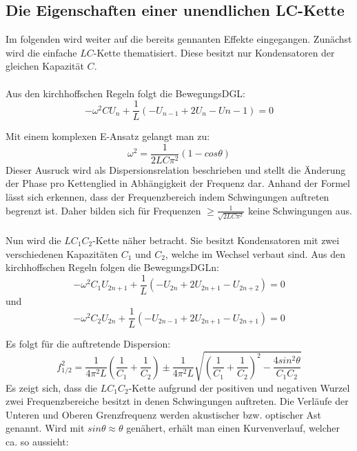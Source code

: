 \subsection{Die Eigenschaften einer unendlichen LC-Kette}


Im folgenden wird weiter auf die bereits gennanten Effekte eingegangen. Zunächst
 wird die einfache $LC$-Kette thematisiert. Diese besitzt nur Kondensatoren der
 gleichen Kapazität $C$.\\\\

Aus den kirchhoffschen Regeln folgt die BewegungsDGL:
\begin{equation}
- \omega ^2 C U_n + \frac{1}{L} \left( -U_{n-1} + 2U_ n -U{n-1} \right) = 0
\end{equation}

Mit einem komplexen E-Ansatz gelangt man zu:
\begin{equation}
\omega ^2 = \frac{1}{2LC\pi^2}(1-cos\theta)
\end{equation}
Dieser Ausruck wird als Dispersionsrelation beschrieben und stellt die Änderung
 der Phase pro Kettenglied in Abhängigkeit der Frequenz dar. Anhand der Formel lässt sich erkennen,
  dass der Frequenzbereich indem Schwingungen auftreten begrenzt ist. Daher bilden sich
   für Frequenzen $\geq \frac{1}{\sqrt{2LC\pi^2}}$ keine Schwingungen aus.\\\\

 Nun wird die $LC_1C_2$-Kette näher betracht. Sie besitzt Kondensatoren mit zwei
  verschiedenen Kapazitäten $C_1$ und $C_2$, welche im Wechsel verbaut sind.
 Aus den kirchhoffschen Regeln folgen die BewegungsDGLn:
 \begin{equation}
   -\omega^2 C_1 U_{2n+1} + \frac{1}{L} \left( -U_{2n} + 2U_{2n+1} - U_{2n+2} \right) = 0
 \end{equation}
 und
 \begin{equation}
   -\omega^2 C_2 U_{2n} + \frac{1}{L} \left( -U_{2n-1} + 2U_{2n+1} - U_{2n+1} \right) = 0
 \end{equation}

Es folgt für die auftretende Dispersion:
\begin{equation}
  f_{1/2}^2 = \frac{1}{4\pi^2L}\left(\frac{1}{C_1}+\frac{1}{C_2}\right) \pm \frac{1}{4\pi^2L}\sqrt{\left(\frac{1}{C_1}+\frac{1}{C_2} \right)^2 - \frac{4 sin^2\theta}{C_1C_2}}
\end{equation}
Es zeigt sich, dass die $LC_1C_2$-Kette aufgrund der positiven und negativen Wurzel
zwei Frequenzbereiche besitzt in denen Schwingungen auftreten. Die Verläufe der Unteren und Oberen
 Grenzfrequenz werden akustischer bzw. optischer Ast genannt. Wird mit
$sin \theta \approx \theta$ genähert, erhält man einen Kurvenverlauf, welcher ca. so aussieht:

